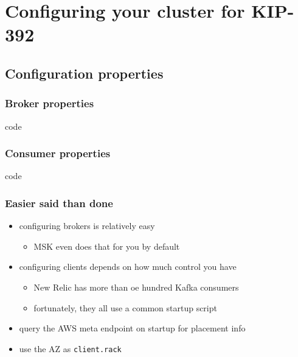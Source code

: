 \documentclass{beamer}
\newlength{\wideitemsep}
\let\olditem\item
\renewcommand{\item}{\setlength{\itemsep}{\wideitemsep}\olditem}
\begin{document}
\section{Configuring your cluster for KIP-392}
\subsection{Configuration properties}

\begin{frame}
  \frametitle{Broker properties}

  \begin{beamercolorbox}[sep=1em]{code}
    
  \end{beamercolorbox}

\end{frame}

\begin{frame}
  \frametitle{Consumer properties}

  \begin{beamercolorbox}[sep=1em]{code}
    
  \end{beamercolorbox}

\end{frame}

\begin{frame}
  \frametitle{Easier said than done}

  \begin{itemize}
  \item configuring \alert{brokers} is relatively easy
    \begin{itemize}
    \item MSK even does that for you by default
    \end{itemize}
  \item configuring \alert{clients} depends on how much control you have
    \begin{itemize}
    \item New Relic has more than \alert{oe hundred} Kafka consumers
    \item fortunately, they all use a \alert{common startup script}
    \end{itemize}
  \item query the AWS \alert{meta endpoint} on startup for placement info
  \item use the AZ as \alert{\texttt{client.rack}}
  \end{itemize}
\end{frame}
\end{document}
